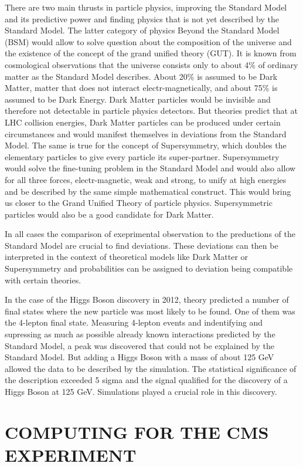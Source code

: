 \documentclass{wscpaperproc}
\theoremstyle{wsc}
\begin{document}
There are two main thrusts in particle physics, improving the Standard Model and its predictive power and finding physics that is not yet described by the Standard Model. The latter category of physics Beyond the Standard Model (BSM) would allow to solve question about the composition of the universe and the existence of the concept of the grand unified theory (GUT). It is known from cosmological observations that the universe consists only to about 4\% of ordinary matter as the Standard Model describes. About 20\% is assumed to be Dark Matter, matter that does not interact electr-magnetically, and about 75\% is assumed to be Dark Energy. Dark Matter particles would be invisible and therefore not detectable in particle physics detectors. But theories predict that at LHC collision energies, Dark Matter particles can be produced under certain circumstances and would manifest themselves in deviations from the Standard Model. The same is true for the concept of Supersymmetry, which doubles the elementary particles to give every particle its super-partner. Supersymmetry would solve the fine-tuning problem in the Standard Model and would also allow for all three forces, electr-magnetic, weak and strong, to unify at high energies and be described by the same simple mathematical construct. This would bring us closer to the Grand Unified Theory of particle physics. Supersymmetric particles would also be a good candidate for Dark Matter.

In all cases the comparison of exeprimental observation to the preductions of the Standard Model are crucial to find deviations. These deviations can then be interpreted in the context of theoretical models like Dark Matter or Supersymmetry and probabilities can be assigned to deviation being compatible with certain theories.

In the case of the Higgs Boson discovery in 2012, theory predicted a number of final states where the new particle was most likely to be found. One of them was the 4-lepton final state. Measuring 4-lepton events and indentifying and supressing as much as possible already known interactions predicted by the Standard Model, a peak was discovered that could not be explained by the Standard Model. But adding a Higgs Boson with a mass of about 125 GeV allowed the data to be described by the simulation. The statistical significance of the description exceeded 5 sigma and the signal qualified for the discovery of a Higgs Boson at 125 GeV. Simulations played a crucial role in this discovery.

\section{COMPUTING FOR THE CMS EXPERIMENT}
\label{sec:computing}
\end{document}
